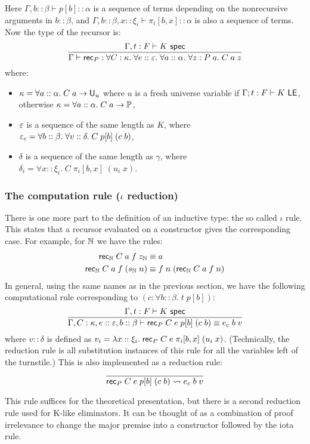 Here $\Gamma,b::\beta\vdash p[b]::\alpha$ is a sequence of terms depending on the nonrecursive arguments in $b::\beta$, and $\Gamma,b::\beta,x::\xi_i\vdash \pi_i[b,x]::\alpha$ is also a sequence of terms. Now the type of the recursor is:
$$\frac{\Gamma,t:F\vdash K\spec}{\Gamma\vdash\rec_P:\forall C:\kappa.\;\forall e::\vep.\;\forall a::\alpha.\;\forall z:P\;a.\;C\;a\;z}$$
where:
\begin{itemize}
\item $\kappa=\forall a::\alpha.\;C\;a\to\U_u$ where $u$ is a fresh universe variable if $\Gamma;t:F\vdash K\LE$, otherwise $\kappa=\forall a::\alpha.\;C\;a\to\P$,
\item $\vep$ is a sequence of the same length as $K$, where $\vep_c=\forall b::\beta.\;\forall v::\delta.\;C\;p[b]\;(c\;b)$,
\item $\delta$ is a sequence of the same length as $\gamma$, where $\delta_i=\forall x::\xi_i.\;C\;\pi_i[b,x]\;(u_i\;x)$.
\end{itemize}

\subsubsection{The computation rule ($\iota$ reduction)}

There is one more part to the definition of an inductive type: the so called $\iota$ rule. This states that a recursor evaluated on a constructor gives the corresponding case. For example, for $\N$ we have the rules:
%
\begin{align*}
\mathsf{rec}_\N\;C\;a\;f\;z_\N&\equiv a\\
\mathsf{rec}_\N\;C\;a\;f\;(s_\N\;n)&\equiv f\;n\;(\mathsf{rec}_\N\;C\;a\;f\;n)
\end{align*}
%
In general, using the same names as in the previous section, we have the following computational rule corresponding to $(c:\forall b::\beta.\;t\;p[b])$:
$$\frac{\Gamma,t:F\vdash K\spec}{\Gamma,C:\kappa,e::\vep,b::\beta\vdash\rec_P\;C\;e\;p[b]\;(c\;b)\equiv e_c\;b\;v}$$
where $v::\delta$ is defined as $v_i=\lambda x::\xi_i.\;\rec_P\;C\;e\;\pi_i[b,x]\;(u_i\;x)$. (Technically, the reduction rule is all substitution instances of this rule for all the variables left of the turnstile.) This is also implemented as a reduction rule:
$$\frac{}{\rec_P\;C\;e\;p[b]\;(c\;b)\rightsquigarrow e_c\;b\;v}$$

This rule suffices for the theoretical presentation, but there is a second reduction rule used for K-like eliminators. It can be thought of as a combination of proof irrelevance to change the major premise into a constructor followed by the iota rule.

